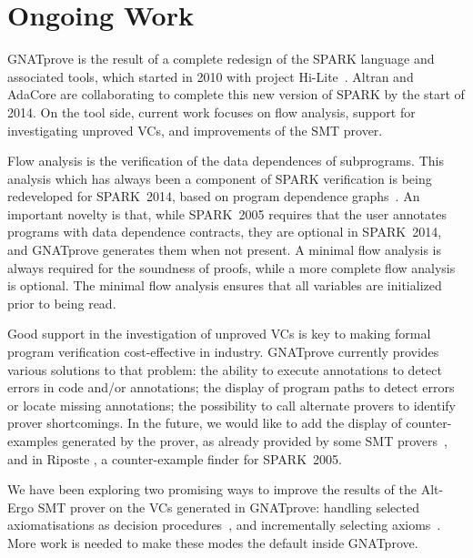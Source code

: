 \documentclass[sttt,final]{svjour}
\newcommand{\hilite}{Hi-Lite}
\newcommand{\gnatprove}{GNATprove\xspace}
\newcommand{\oldspark}{SPARK~2005\xspace}
\newcommand{\newspark}{SPARK~2014\xspace}
\begin{document}

\section{Ongoing Work}
\label{ongoing}

\gnatprove is the result of a complete redesign of the SPARK language and
associated tools, which started in 2010 with project \hilite\ \cite{Hi-Lite}.
Altran and AdaCore are collaborating to complete this new version of SPARK by
the start of 2014. On the tool side, current work focuses on flow analysis,
support for investigating unproved VCs, and improvements of the SMT prover.

Flow analysis is the verification of the data dependences of
subprograms. This analysis which has always been a component of SPARK
verification is being redeveloped for \newspark, based on
program dependence graphs~\cite{horwitz:1988:pldi}. An important
novelty is that, while \oldspark requires that the user annotates
programs with data dependence contracts, they are optional in
\newspark, and \gnatprove generates them when not present. A minimal
flow analysis is always required for the soundness of proofs, while a
more complete flow analysis is optional. The minimal flow analysis
ensures that all variables are initialized prior to being read.

Good support in the investigation of unproved VCs is key to making
formal program verification cost-effective in industry. \gnatprove
currently provides various solutions to that problem: the ability to
execute annotations to detect errors in code and/or annotations; the
display of program paths to detect errors or locate missing
annotations; the possibility to call alternate provers to identify
prover shortcomings. In the future, we would like to add the display
of counter-examples generated by the prover, as already provided by
some SMT provers~\cite{CVC3,Z3model}, and in Riposte
\cite{riposteICLP}, a counter-example finder for \oldspark.

We have been exploring two promising ways to improve the results of the
Alt-Ergo SMT prover on the VCs generated in \gnatprove: handling selected
axiomatisations as decision procedures~\cite{dross:2012:smt}, and incrementally
selecting axioms~\cite{cgs09:ipo,kuhlwein:2012:ijcar}. More work is needed to
make these modes the default inside \gnatprove.
\end{document}
